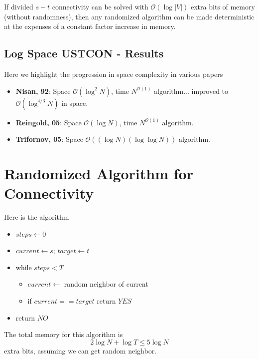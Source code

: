 \begin{proposition}
	If divided $s-t$ connectivity can be solved with $\mathcal O (\log |V| )$ extra bits of memory (without randomness), then any randomized algorithm can be made deterministic at the expenses of a constant factor increase in memory. 
\end{proposition}

\subsection{Log Space USTCON - Results}
Here we highlight the progression in space complexity in various papers
\begin{itemize}
	\item \textbf{Nisan, 92}: Space $\mathcal O (\log ^ 2 N)$, time $N ^{\mathcal O (1)}$ algorithm... improved to $\mathcal O (\log ^ {4/3} N)$ in space. 
	\item \textbf{Reingold, 05}: Space $\mathcal O (\log N)$, time $N ^{\mathcal O (1)}$ algorithm. 
	\item \textbf{Trifornov, 05}: Space $\mathcal O ((\log N )(\log\log N))$ algorithm. 
\end{itemize}

\section{Randomized Algorithm for Connectivity}
\begin{algorithm} Here is the algorithm
	\begin{itemize}
		\item $steps \gets 0 $ 
		\item $current \gets s$; $target \gets t$
		\item while $steps < T$
		\begin{itemize}
			\item $current \gets $ random neighbor of current
			\item if $current == target$ return $YES$
		\end{itemize}
		\item return $NO$
	\end{itemize}
\end{algorithm}
The total memory for this algorithm is 
\begin{equation}
	2 \log N + \log T \leq 5 \log N
\end{equation}
extra bits, assuming we can get random neighbor. 

